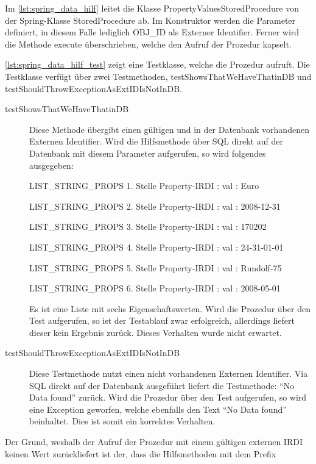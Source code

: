 Im \autoref{lst:spring_data_hilf} leitet die Klasse PropertyValuesStoredProcedure von der Spring-Klasse StoredProcedure ab. Im Konstruktor werden die Parameter definiert, in diesem Falle lediglich OBJ\_ID als Externer Identifier. Ferner wird die Methode execute überschrieben, welche den Aufruf der Prozedur kapselt. 

\autoref{lst:spring_data_hilf_test} zeigt eine Testklasse, welche die Prozedur aufruft. Die Testklasse verfügt über zwei Testmethoden, testShowsThatWeHaveThatinDB und testShouldThrowExceptionAsExtIDIsNotInDB. 

\begin{description}
\item[ testShowsThatWeHaveThatinDB] Diese Methode übergibt einen gültigen und in der Datenbank vorhandenen Externen Identifier. Wird die Hilfsmethode über SQL direkt auf der Datenbank mit diesem Parameter aufgerufen, so wird folgendes ausgegeben:

  LIST\_STRING\_PROPS 1. Stelle
  Property-IRDI :  val : Euro
  
  LIST\_STRING\_PROPS 2. Stelle
  Property-IRDI :  val : 2008-12-31
  
  LIST\_STRING\_PROPS 3. Stelle
  Property-IRDI :  val : 170202
  
  LIST\_STRING\_PROPS 4. Stelle
  Property-IRDI :  val : 24-31-01-01
  
  LIST\_STRING\_PROPS 5. Stelle
  Property-IRDI :  val : Rundolf-75
  
  LIST\_STRING\_PROPS 6. Stelle
  Property-IRDI :  val : 2008-05-01
  
Es ist eine Liste mit sechs Eigenschaftswerten.
Wird die Prozedur über den Test aufgerufen, so ist der Testablauf zwar erfolgreich, allerdings liefert dieser kein Ergebnis zurück. Dieses Verhalten wurde nicht erwartet. 
  
\item[ testShouldThrowExceptionAsExtIDIsNotInDB] Diese Testmethode nutzt einen nicht vorhandenen Externen Identifier. Via SQL direkt auf der Datenbank ausgeführt liefert die Testmethode: \enquote{No Data found} zurück. 
Wird die Prozedur über den Test aufgerufen, so wird eine Exception geworfen, welche ebenfalls den Text  \enquote{No Data found} beinhaltet. Dies ist somit ein korrektes Verhalten. 
\end{description}

Der Grund, weshalb der Aufruf der Prozedur mit einem gültigen externen \gls{IRDI} keinen Wert zurückliefert ist der, dass die Hilfsmethoden mit dem Prefix 


